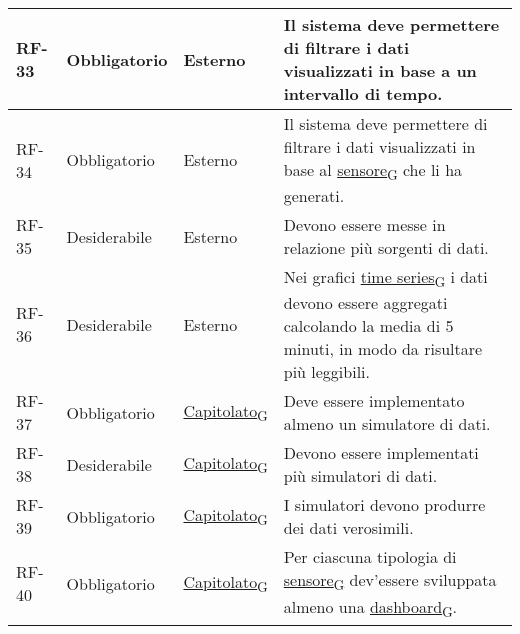 \begin{longtable}{|>{\centering\arraybackslash}m{}|>{\centering\arraybackslash}m{}|>{\centering\arraybackslash}m{}|>{\centering\arraybackslash}m{}|}
	RF-33           & Obbligatorio        & Esterno                                                                                                           & Il sistema deve permettere di filtrare i dati visualizzati in base a un intervallo di tempo.
	\\\hline
	RF-34           & Obbligatorio        & Esterno                                                                                                           & Il sistema deve permettere di filtrare i dati visualizzati in base al \href{https://7last.github.io/docs/rtb/documentazione-interna/glossario\#sensore}{sensore\textsubscript{G}} che li ha generati.
	\\\hline
	RF-35           & Desiderabile        & Esterno                                                                                                           & Devono essere messe in relazione più sorgenti di dati.
	\\\hline
	RF-36           & Desiderabile        & Esterno                                                                                                           & Nei grafici \href{https://7last.github.io/docs/rtb/documentazione-interna/glossario\#time-series}{time series\textsubscript{G}} i dati devono essere aggregati calcolando la media di 5 minuti, in modo da risultare più leggibili.
	\\\hline
	RF-37           & Obbligatorio        & \href{https://7last.github.io/docs/rtb/documentazione-interna/glossario\#capitolato}{Capitolato\textsubscript{G}} & Deve essere implementato almeno un simulatore di dati.
	\\\hline
	RF-38           & Desiderabile        & \href{https://7last.github.io/docs/rtb/documentazione-interna/glossario\#capitolato}{Capitolato\textsubscript{G}} & Devono essere implementati più simulatori di dati.
	\\\hline
	RF-39           & Obbligatorio        & \href{https://7last.github.io/docs/rtb/documentazione-interna/glossario\#capitolato}{Capitolato\textsubscript{G}} & I simulatori devono produrre dei dati verosimili.
	\\\hline
	RF-40           & Obbligatorio        & \href{https://7last.github.io/docs/rtb/documentazione-interna/glossario\#capitolato}{Capitolato\textsubscript{G}} & Per ciascuna tipologia di \href{https://7last.github.io/docs/rtb/documentazione-interna/glossario\#sensore}{sensore\textsubscript{G}} dev'essere sviluppata almeno una \href{https://7last.github.io/docs/rtb/documentazione-interna/glossario\#dashboard}{dashboard\textsubscript{G}}.

\end{longtable}
